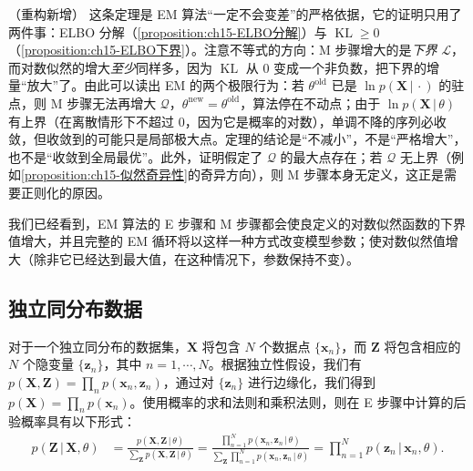 \documentclass[../../main.tex]{subfiles}
\begin{document}
\begin{remark}（重构新增）
这条定理是 EM 算法“一定不会变差”的严格依据，它的证明只用了两件事：ELBO 分解（\cref{proposition:ch15-ELBO分解}）与 $\operatorname{KL}\geqslant0$（\cref{proposition:ch15-ELBO下界}）。注意不等式的方向：M 步骤增大的是\emph{下界} $\mathcal{L}$，而对数似然的增大\emph{至少}同样多，因为 $\operatorname{KL}$ 从 $0$ 变成一个非负数，把下界的增量“放大”了。由此可以读出 EM 的两个极限行为：若 $\theta^{\text{old}}$ 已是 $\ln p(\bm{X}\,|\,\cdot)$ 的驻点，则 M 步骤无法再增大 $\mathcal{Q}$，$\theta^{\text{new}}=\theta^{\text{old}}$，算法停在不动点；由于 $\ln p(\bm{X}\,|\,\theta)$ 有上界（在离散情形下不超过 $0$，因为它是概率的对数），单调不降的序列必收敛，但收敛到的可能只是局部极大点。定理的结论是“不减小”，不是“严格增大”，也不是“收敛到全局最优”。此外，证明假定了 $\mathcal{Q}$ 的最大点存在；若 $\mathcal{Q}$ 无上界（例如\cref{proposition:ch15-似然奇异性}的奇异方向），则 M 步骤本身无定义，这正是需要正则化的原因。
\end{remark}

我们已经看到，EM 算法的 E 步骤和 M 步骤都会使良定义的对数似然函数的下界值增大，并且完整的 EM 循环将以这样一种方式改变模型参数；使对数似然值增大（除非它已经达到最大值，在这种情况下，参数保持不变）。

\subsection{独立同分布数据}\label{subsection:ch15-独立同分布}

对于一个独立同分布的数据集，$\bm{X}$ 将包含 $N$ 个数据点 $\{\bm{x}_n\}$，而 $\bm{Z}$ 将包含相应的 $N$ 个隐变量 $\{\bm{z}_n\}$，其中 $n=1,\cdots,N$。根据独立性假设，我们有 $p(\bm{X},\bm{Z})=\prod_n p(\bm{x}_n,\bm{z}_n)$，通过对 $\{\bm{z}_n\}$ 进行边缘化，我们得到 $p(\bm{X})=\prod_n p(\bm{x}_n)$。使用概率的求和法则和乘积法则，则在 E 步骤中计算的后验概率具有以下形式：
\begin{align}
p(\bm{Z}\,|\,\bm{X},\theta)
&=\frac{p(\bm{X},\bm{Z}\,|\,\theta)}{\sum_{\bm{Z}}p(\bm{X},\bm{Z}\,|\,\theta)}
=\frac{\prod_{n=1}^{N}p(\bm{x}_n,\bm{z}_n\,|\,\theta)}{\sum_{\bm{Z}}\prod_{n=1}^{N}p(\bm{x}_n,\bm{z}_n\,|\,\theta)}
=\prod_{n=1}^{N}p(\bm{z}_n\,|\,\bm{x}_n,\theta).
\label{align:ch15-iid-posterior}
\end{align}
\end{document}
